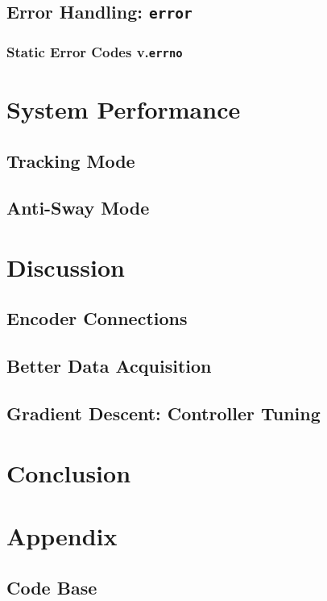 \documentclass[letterpaper]{article}
\begin{document}
\subsection{Error Handling: \texttt{error}}
\subsubsection{Static Error Codes v.\texttt{errno}}

\newpage

\section{System Performance}
\subsection{Tracking Mode}
\subsection{Anti-Sway Mode}

\newpage

\section{Discussion}
\subsection{Encoder Connections}
\subsection{Better Data Acquisition}
\subsection{Gradient Descent: Controller Tuning}

\newpage

\section{Conclusion}

\newpage

\section{Appendix}
\subsection{Code Base}
\end{document}
